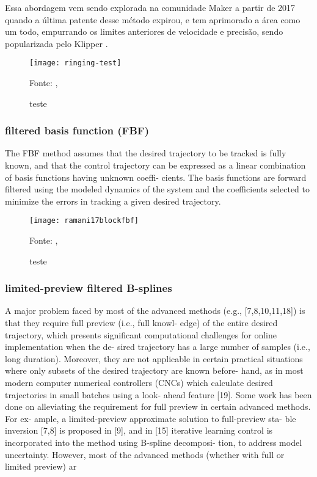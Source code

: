 Essa abordagem vem sendo explorada na comunidade Maker a partir de 2017 
quando a última patente desse método expirou, e tem aprimorado a área como
um todo, empurrando os limites anteriores de velocidade e precisão,
sendo popularizada pelo Klipper \cite{klipperkinematic}.


\begin{figure}[!htb]
    \centering
    \caption{teste}
    \texttt{[image: ringing-test]}

    {\footnotesize Fonte: \citeauthor{klipperkinematic}, \citeyear{klipperkinematic}}
    \label{fig:label4}
\end{figure}

\subsubsection{filtered basis function (FBF)}
The FBF method assumes that the desired trajectory to be tracked
is fully known, and that the control trajectory can be expressed as
a linear combination of basis functions having unknown coeffi-
cients. The basis functions are forward filtered using the modeled
dynamics of the system and the coefficients selected to minimize
the errors in tracking a given desired trajectory.
\cite{ramani17}

\begin{figure}[!htb]
    \centering
    \caption{teste}
    \texttt{[image: ramani17blockfbf]}

    {\footnotesize Fonte: \citeauthor{ramani17}, \citeyear{ramani17}}
    \label{fig:label7}
\end{figure}

\subsubsection{limited-preview filtered B-splines}
A major problem faced by most of the advanced methods
(e.g., [7,8,10,11,18]) is that they require full preview (i.e., full knowl-
edge) of the entire desired trajectory, which presents significant
computational challenges for online implementation when the de-
sired trajectory has a large number of samples (i.e., long duration).
Moreover, they are not applicable in certain practical situations
where only subsets of the desired trajectory are known before-
hand, as in most modern computer numerical controllers (CNCs)
which calculate desired trajectories in small batches using a look-
ahead feature [19]. Some work has been done on alleviating the
requirement for full preview in certain advanced methods. For ex-
ample, a limited-preview approximate solution to full-preview sta-
ble inversion [7,8] is proposed in [9], and in [15] iterative learning
control is incorporated into the method using B-spline decomposi-
tion, to address model uncertainty. However, most of the advanced
methods (whether with full or limited preview) ar
\cite{duan18}


